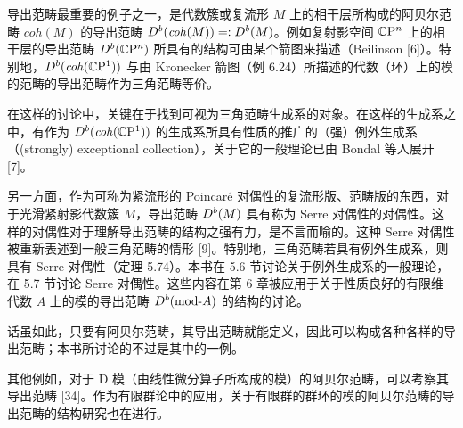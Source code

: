 
导出范畴最重要的例子之一，是代数簇或复流形 $M$ 上的相干层所构成的阿贝尔范畴 $\mathit{coh}(M)$ 的导出范畴 $D^{b}(\mathit{coh}(M))=:D^{b}(M)$。例如复射影空间 $\mathbb{C}\mathrm{P}^n$ 上的相干层的导出范畴 $D^{b}(\mathbb{C}\mathrm{P}^n)$ 所具有的结构可由某个箭图来描述（Beilinson [6]）。特别地，$D^{b}(\mathit{coh}(\mathbb{C}\mathrm{P}^1))$ 与由 Kronecker 箭图（例 6.24）所描述的代数（环）上的模的范畴的导出范畴作为三角范畴等价。


在这样的讨论中，关键在于找到可视为三角范畴生成系的对象。在这样的生成系之中，有作为 $D^{b}(\mathit{coh}(\mathbb{C}\mathrm{P}^1))$ 的生成系所具有性质的推广的（强）例外生成系（(strongly) exceptional collection），关于它的一般理论已由 Bondal 等人展开 [7]。

另一方面，作为可称为紧流形的 Poincaré 对偶性的复流形版、范畴版的东西，对于光滑紧射影代数簇 $M$，导出范畴 $D^{b}(M)$ 具有称为 Serre 对偶性的对偶性。这样的对偶性对于理解导出范畴的结构之强有力，是不言而喻的。这种 Serre 对偶性被重新表述到一般三角范畴的情形 [9]。特别地，三角范畴若具有例外生成系，则具有 Serre 对偶性（定理 5.74）。本书在 5.6 节讨论关于例外生成系的一般理论，在 5.7 节讨论 Serre 对偶性。这些内容在第 6 章被应用于关于性质良好的有限维代数 $A$ 上的模的导出范畴 $D^{b}(\mathrm{mod}\text{-}A)$ 的结构的讨论。


话虽如此，只要有阿贝尔范畴，其导出范畴就能定义，因此可以构成各种各样的导出范畴；本书所讨论的不过是其中的一例。

其他例如，对于 D 模（由线性微分算子所构成的模）的阿贝尔范畴，可以考察其导出范畴 [34]。作为有限群论中的应用，关于有限群的群环的模的阿贝尔范畴的导出范畴的结构研究也在进行。

